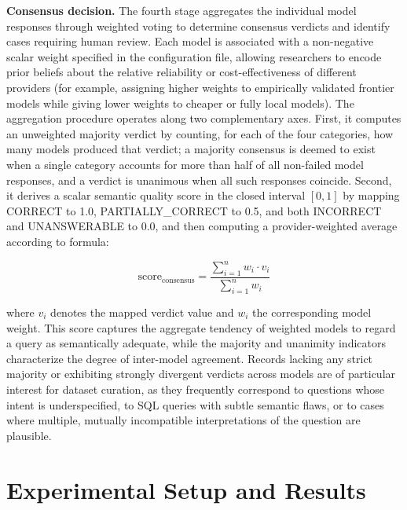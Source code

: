 \documentclass[print]{einformatica}
\begin{document}
\textbf{Consensus decision.} The fourth stage aggregates the individual model responses through weighted voting to determine consensus verdicts and identify cases requiring human review. Each model is associated with a non-negative scalar weight specified in the configuration file, allowing researchers to encode prior beliefs about the relative reliability or cost-effectiveness of different providers (for example, assigning higher weights to empirically validated frontier models while giving lower weights to cheaper or fully local models). The aggregation procedure operates along two complementary axes. First, it computes an unweighted majority verdict by counting, for each of the four categories, how many models produced that verdict; a majority consensus is deemed to exist when a single category accounts for more than half of all non-failed model responses, and a verdict is unanimous when all such responses coincide. Second, it derives a scalar semantic quality score in the closed interval $[0,1]$ by mapping CORRECT to 1.0, PARTIALLY\_CORRECT to 0.5, and both INCORRECT and UNANSWERABLE to 0.0, and then computing a provider-weighted average according to formula:

\begin{equation*}
\text{score}_{\text{consensus}} = \frac{\sum_{i=1}^{n} w_i \cdot v_i}{\sum_{i=1}^{n} w_i}
\end{equation*}

where $v_i$ denotes the mapped verdict value and $w_i$ the corresponding model weight. This score captures the aggregate tendency of weighted models to regard a query as semantically adequate, while the majority and unanimity indicators characterize the degree of inter-model agreement. Records lacking any strict majority or exhibiting strongly divergent verdicts across models are of particular interest for dataset curation, as they frequently correspond to questions whose intent is underspecified, to SQL queries with subtle semantic flaws, or to cases where multiple, mutually incompatible interpretations of the question are plausible.

\section{Experimental Setup and Results}\label{sec:Results}
\end{document}
